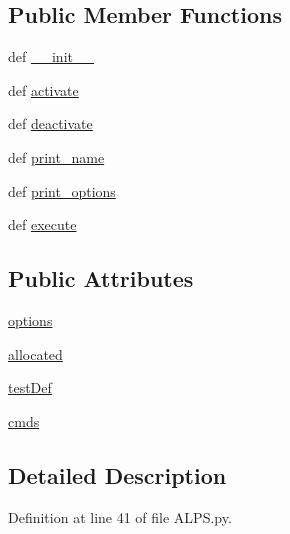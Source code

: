 \subsection*{Public Member Functions}
\begin{DoxyCompactItemize}
\item 
def \hyperlink{classALPS_1_1ALPS_a45417f6290435c66b3f3b7c4586915d9}{\-\_\-\-\_\-init\-\_\-\-\_\-}
\item 
def \hyperlink{classALPS_1_1ALPS_a3d507bd3feb505c8ed1b4e8f3729d636}{activate}
\item 
def \hyperlink{classALPS_1_1ALPS_aa1d63291a23bcca8ccbd44dc4d0fa6bf}{deactivate}
\item 
def \hyperlink{classALPS_1_1ALPS_a97e56ee7f5faaea26121d6ee0deeddab}{print\-\_\-name}
\item 
def \hyperlink{classALPS_1_1ALPS_a68c17d876ad850e44d40aa082b674f4e}{print\-\_\-options}
\item 
def \hyperlink{classALPS_1_1ALPS_af4b8efc64ea3abc5fb21fb93bfe052ff}{execute}
\end{DoxyCompactItemize}
\subsection*{Public Attributes}
\begin{DoxyCompactItemize}
\item 
\hyperlink{classALPS_1_1ALPS_a24dfa9b508f507c4cb6148f10a081555}{options}
\item 
\hyperlink{classALPS_1_1ALPS_ac371dce53e8c120f7031259025562bdb}{allocated}
\item 
\hyperlink{classALPS_1_1ALPS_a839c4f84a46683221d51004c08345ff2}{test\-Def}
\item 
\hyperlink{classALPS_1_1ALPS_a64bae95ba692ef4df06f716692b50ee9}{cmds}
\end{DoxyCompactItemize}


\subsection{Detailed Description}


Definition at line 41 of file A\-L\-P\-S.\-py.



